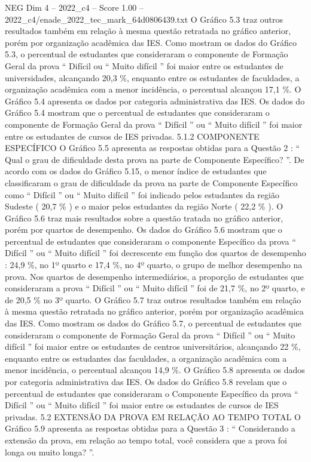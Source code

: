 \begin{textsample}{NEG Dim 4 – 2022\_c4 – Score 1.00 – 2022\_c4/enade\_2022\_tec\_mark\_64d0806439.txt}
O Gráfico 5.3 traz outros resultados também em relação à mesma questão retratada no gráfico anterior, porém por organização acadêmica das IES.
Como mostram os dados do Gráfico 5.3, o percentual de estudantes que consideraram o componente de Formação Geral da prova “ Difícil ou “ Muito difícil ” foi maior entre os estudantes de universidades, alcançando 20,3 \%, enquanto entre os estudantes de faculdades, a organização acadêmica com a menor incidência, o percentual alcançou 17,1 \%.
O Gráfico 5.4 apresenta os dados por categoria administrativa das IES.
Os dados do Gráfico 5.4 mostram que o percentual de estudantes que consideraram o componente de Formação Geral da prova “ Difícil ” ou “ Muito difícil ” foi maior entre os estudantes de cursos de IES privadas. 5.1.2 COMPONENTE ESPECÍFICO O Gráfico 5.5 apresenta as respostas obtidas para a Questão 2 : “ Qual o grau de dificuldade desta prova na parte de Componente Específico? ”.
De acordo com os dados do Gráfico 5.15, o menor índice de estudantes que classificaram o grau de dificuldade da prova na parte de Componente Específico como “ Difícil ” ou “ Muito difícil ” foi indicado pelos estudantes da região Sudeste ( 20,7 \% ) e o maior pelos estudantes da região Norte ( 22,2 \% ).
O Gráfico 5.6 traz mais resultados sobre a questão tratada no gráfico anterior, porém por quartos de desempenho.
Os dados do Gráfico 5.6 mostram que o percentual de estudantes que consideraram o componente Específico da prova “ Difícil ” ou “ Muito difícil ” foi decrescente em função dos quartos de desempenho : 24,9 \%, no 1º quarto e 17,4 \%, no 4º quarto, o grupo de melhor desempenho na prova.
Nos quartos de desempenho intermediários, a proporção de estudantes que consideraram a prova “ Difícil ” ou “ Muito difícil ” foi de 21,7 \%, no 2º quarto, e de 20,5 \% no 3º quarto.
O Gráfico 5.7 traz outros resultados também em relação à mesma questão retratada no gráfico anterior, porém por organização acadêmica das IES.
Como mostram os dados do Gráfico 5.7, o percentual de estudantes que consideraram o componente de Formação Geral da prova “ Difícil ” ou “ Muito difícil ” foi maior entre os estudantes de centros universitários, alcançando 22 \%, enquanto entre os estudantes das faculdades, a organização acadêmica com a menor incidência, o percentual alcançou 14,9 \%.
O Gráfico 5.8 apresenta os dados por categoria administrativa das IES.
Os dados do Gráfico 5.8 revelam que o percentual de estudantes que consideraram o Componente Específico da prova “ Difícil ” ou “ Muito difícil ” foi maior entre os estudantes de cursos de IES privadas. 5.2 EXTENSÃO DA PROVA EM RELAÇÃO AO TEMPO TOTAL O Gráfico 5.9 apresenta as respostas obtidas para a Questão 3 : “ Considerando a extensão da prova, em relação ao tempo total, você considera que a prova foi longa ou muito longa? ”.

\end{textsample}
